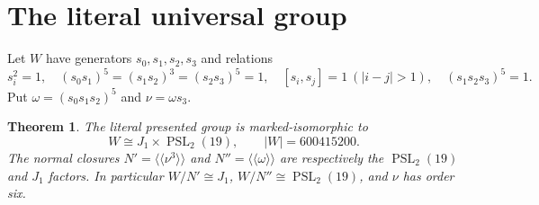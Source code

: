 \documentclass[11pt,a4paper]{article}
\newtheorem{theorem}{Theorem}\newtheorem{lemma}[theorem]{Lemma}
\newcommand{\PSL}{\operatorname{PSL}}\newcommand{\Aut}{\operatorname{Aut}}
\begin{document}
\section{The literal universal group}
Let $W$ have generators $s_0,s_1,s_2,s_3$ and relations
\begin{equation}\label{W}
 s_i^2=1,\quad(s_0s_1)^5=(s_1s_2)^3=(s_2s_3)^5=1,
 \quad[s_i,s_j]=1\ (|i-j|>1),\quad(s_1s_2s_3)^5=1.
\end{equation}
Put $\omega=(s_0s_1s_2)^5$ and $\nu=\omega s_3$.
\begin{theorem}\label{structure}
The literal presented group is marked-isomorphic to
\[
 W\cong J_1\times\PSL_2(19),\qquad |W|=600415200.
\]
The normal closures $N'=\langle\!\langle\nu^3\rangle\!\rangle$ and $N''=\langle\!\langle\omega\rangle\!\rangle$ are respectively the $\PSL_2(19)$ and $J_1$ factors. In particular $W/N'\cong J_1$, $W/N''\cong\PSL_2(19)$, and $\nu$ has order six.
\end{theorem}
\end{document}
